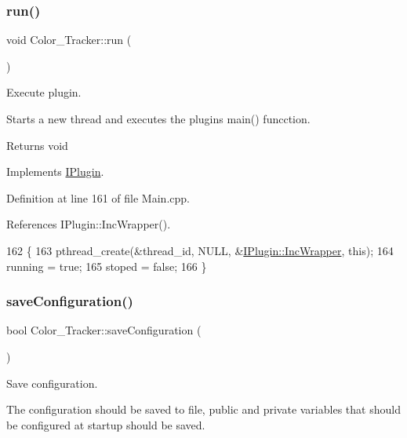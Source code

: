 \subsubsection{\texorpdfstring{run()}{run()}}
{\footnotesize\ttfamily void Color\+\_\+\+Tracker\+::run (\begin{DoxyParamCaption}{ }\end{DoxyParamCaption})\hspace{0.3cm}{\ttfamily [virtual]}}



Execute plugin. 

Starts a new thread and executes the plugins main() funcction. \begin{DoxyReturn}{Returns}
void 
\end{DoxyReturn}


Implements \hyperlink{class_i_plugin_a46b4ace767e77f9db9c9585e99c09039}{I\+Plugin}.



Definition at line 161 of file Main.\+cpp.



References I\+Plugin\+::\+Inc\+Wrapper().


\begin{DoxyCode}
162 \{
163     pthread\_create(&thread\_id, NULL, &\hyperlink{class_i_plugin_a62d22be2fdf66eb7f5c2f797f5f3d7f3}{IPlugin::IncWrapper}, \textcolor{keyword}{this});
164     running = \textcolor{keyword}{true};
165     stoped = \textcolor{keyword}{false};
166 \}
\end{DoxyCode}
\mbox{\label{class_color___tracker_a6382a354d9fa79f76c9586a195ea8674}} 
\subsubsection{\texorpdfstring{save\+Configuration()}{saveConfiguration()}}
{\footnotesize\ttfamily bool Color\+\_\+\+Tracker\+::save\+Configuration (\begin{DoxyParamCaption}{ }\end{DoxyParamCaption})\hspace{0.3cm}{\ttfamily [virtual]}}



Save configuration. 

The configuration should be saved to file, public and private variables that should be configured at startup should be saved.

